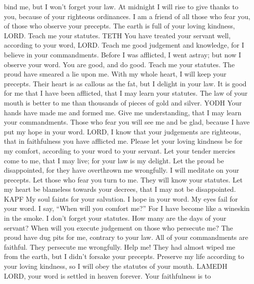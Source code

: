 bind me, but I won't forget your law.  At midnight I will
rise to give thanks to you, because of your righteous ordinances.
 I am a friend of all those who fear you, of those who
observe your precepts.  The earth is full of your loving
kindness, LORD. Teach me your statutes. TETH  You have
treated your servant well, according to your word, LORD. 
Teach me good judgement and knowledge, for I believe in your
commandments.  Before I was afflicted, I went astray; but
now I observe your word.  You are good, and do good. Teach
me your statutes.  The proud have smeared a lie upon me.
With my whole heart, I will keep your precepts.  Their
heart is as callous as the fat, but I delight in your law. 
It is good for me that I have been afflicted, that I may learn your
statutes.  The law of your mouth is better to me than
thousands of pieces of gold and silver. YODH  Your hands
have made me and formed me. Give me understanding, that I may learn your
commandments.  Those who fear you will see me and be glad,
because I have put my hope in your word.  LORD, I know that
your judgements are righteous, that in faithfulness you have afflicted
me.  Please let your loving kindness be for my comfort,
according to your word to your servant.  Let your tender
mercies come to me, that I may live; for your law is my delight.
 Let the proud be disappointed, for they have overthrown me
wrongfully. I will meditate on your precepts.  Let those
who fear you turn to me. They will know your statutes.  Let
my heart be blameless towards your decrees, that I may not be
disappointed. KAPF  My soul faints for your salvation. I
hope in your word.  My eyes fail for your word. I say,
``When will you comfort me?''  For I have become like a
wineskin in the smoke. I don't forget your statutes.  How
many are the days of your servant? When will you execute judgement on
those who persecute me?  The proud have dug pits for me,
contrary to your law.  All of your commandments are
faithful. They persecute me wrongfully. Help me!  They had
almost wiped me from the earth, but I didn't forsake your precepts.
 Preserve my life according to your loving kindness, so I
will obey the statutes of your mouth. LAMEDH  LORD, your
word is settled in heaven forever.  Your faithfulness is to
